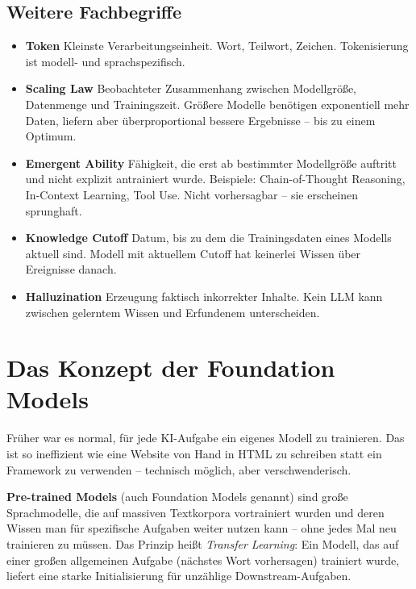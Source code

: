 \subsection{Weitere Fachbegriffe}

\begin{itemize}

    \item \textbf{Token} Kleinste Verarbeitungseinheit. Wort, Teilwort, Zeichen. Tokenisierung ist modell- und sprachspezifisch.
    \item \textbf{Scaling Law} Beobachteter Zusammenhang zwischen Modellgröße, Datenmenge und Trainingszeit. Größere Modelle benötigen exponentiell mehr Daten, liefern aber überproportional bessere Ergebnisse -- bis zu einem Optimum.
    \item \textbf{Emergent Ability} Fähigkeit, die erst ab bestimmter Modellgröße auftritt und nicht explizit antrainiert wurde. Beispiele: Chain-of-Thought Reasoning, In-Context Learning, Tool Use. Nicht vorhersagbar -- sie erscheinen sprunghaft.
    \item \textbf{Knowledge Cutoff} Datum, bis zu dem die Trainingsdaten eines Modells aktuell sind. Modell mit aktuellem Cutoff hat keinerlei Wissen über Ereignisse danach.
    \item \textbf{Halluzination} Erzeugung faktisch inkorrekter Inhalte. Kein LLM kann zwischen \glqq gelerntem Wissen\grqq{} und \glqq Erfundenem\grqq{} unterscheiden.
\end{itemize}

\section{Das Konzept der Foundation Models}

Früher war es normal, für jede KI-Aufgabe ein eigenes Modell zu trainieren. Das ist so ineffizient wie eine Website von Hand in HTML zu schreiben statt ein Framework zu verwenden -- technisch möglich, aber verschwenderisch.

\textbf{Pre-trained Models} (auch Foundation Models genannt) sind große Sprachmodelle, die auf massiven Textkorpora vortrainiert wurden und deren Wissen man für spezifische Aufgaben weiter nutzen kann -- ohne jedes Mal neu trainieren zu müssen. Das Prinzip heißt \textit{Transfer Learning}: Ein Modell, das auf einer großen allgemeinen Aufgabe (nächstes Wort vorhersagen) trainiert wurde, liefert eine starke Initialisierung für unzählige Downstream-Aufgaben.


